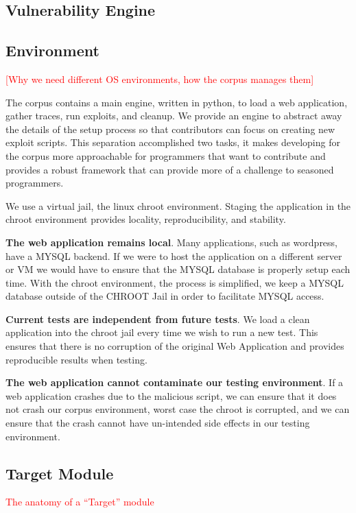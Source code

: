 \documentclass[letterpaper,twocolumn,10pt]{article}
\begin{document}
\subsection{Vulnerability Engine}

\subsection{Environment}
\textcolor{red}{[Why we need different OS environments, how the corpus manages them]}

The corpus contains a main engine, written in python, to load a web application, gather traces, run exploits, and cleanup.  We provide an engine to abstract away the details of the setup process so that contributors can focus on creating new exploit scripts.  This separation accomplished two tasks, it makes developing for the corpus more approachable for programmers that want to contribute and provides a robust framework that can provide more of a challenge to seasoned programmers.

We use a virtual jail, the linux chroot environment.  Staging the application in the chroot environment provides locality, reproducibility, and stability.  

{\bf The web application remains local}.  Many applications, such as wordpress, have a MYSQL backend.  If we were to host the application on a different server or VM we would have to ensure that the MYSQL database is properly setup each time.  With the chroot environment, the process is simplified, we keep a MYSQL database outside of the CHROOT Jail in order to facilitate MYSQL access.  

{\bf Current tests are independent from future tests}.  We load a clean application into the chroot jail every time we wish to run a new test.  This ensures that there is no corruption of the original Web Application and provides reproducible results when testing.

{\bf The web application cannot contaminate our testing environment}.  If a web application crashes due to the malicious script, we can ensure that it does not crash our corpus environment, worst case the chroot is corrupted, and we can ensure that the crash cannot have un-intended side effects in our testing environment.  


\subsection{Target Module}
\textcolor{red}{The anatomy of a ``Target'' module}
\end{document}
